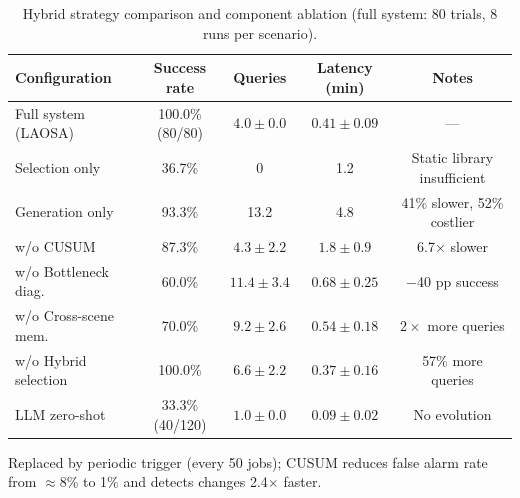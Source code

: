 \begin{table}[h]
\centering
\caption{Hybrid strategy comparison and component ablation (full system: 80 trials, 8 runs per scenario).}
\label{tab:ablation}
\small
\begin{threeparttable}
\begin{tabular}{@{}lcccc@{}}
\toprule
Configuration & Success rate & Queries & Latency (min) & Notes \\
\midrule
Full system (LAOSA) & 100.0\% (80/80) & $4.0\pm0.0$ & $0.41\pm0.09$ & --- \\
\midrule
Selection only      & 36.7\% & 0 & 1.2 & Static library insufficient \\
Generation only     & 93.3\% & 13.2 & 4.8 & 41\% slower, 52\% costlier \\
\midrule
w/o CUSUM\tnote{a}  & 87.3\% & $4.3\pm2.2$ & $1.8\pm0.9$ & 6.7$\times$ slower \\
w/o Bottleneck diag.& 60.0\% & $11.4\pm3.4$& $0.68\pm0.25$& $-$40 pp success \\
w/o Cross-scene mem.& 70.0\% & $9.2\pm2.6$ & $0.54\pm0.18$& $2\times$ more queries \\
w/o Hybrid selection& 100.0\%& $6.6\pm2.2$ & $0.37\pm0.16$& 57\% more queries \\
LLM zero-shot       & 33.3\% (40/120) & $1.0\pm0.0$ & $0.09\pm0.02$ & No evolution \\
\bottomrule
\end{tabular}
\begin{tablenotes}
\footnotesize
\item[a] Replaced by periodic trigger (every 50 jobs); CUSUM reduces false alarm rate from $\approx$8\% to 1\% and detects changes 2.4$\times$ faster.
\end{tablenotes}
\end{threeparttable}
\end{table}